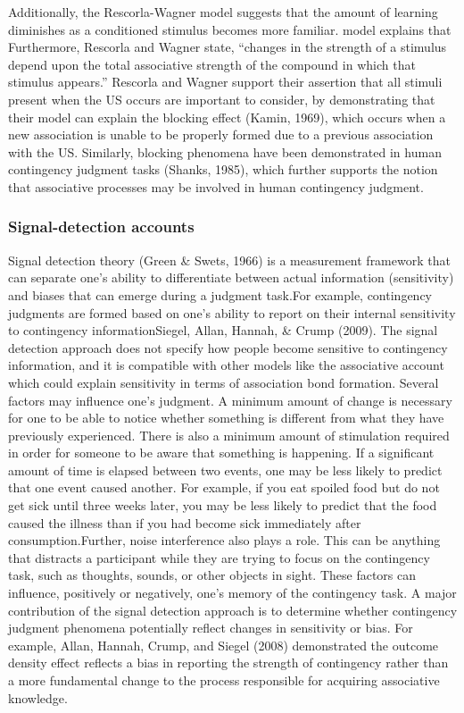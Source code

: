 \documentclass[
  english,
  man,floatsintext]{apa6}
\begin{document}
Additionally, the Rescorla-Wagner model suggests that the amount of learning diminishes as a conditioned stimulus becomes more familiar. model explains that Furthermore, Rescorla and Wagner state, ``changes in the strength of a stimulus depend upon the total associative strength of the compound in which that stimulus appears.'' Rescorla and Wagner support their assertion that all stimuli present when the US occurs are important to consider, by demonstrating that their model can explain the blocking effect (Kamin, 1969), which occurs when a new association is unable to be properly formed due to a previous association with the US. Similarly, blocking phenomena have been demonstrated in human contingency judgment tasks (Shanks, 1985), which further supports the notion that associative processes may be involved in human contingency judgment.

\hypertarget{signal-detection-accounts}{%
\subsubsection{Signal-detection accounts}\label{signal-detection-accounts}}

Signal detection theory (Green \& Swets, 1966) is a measurement framework that can separate one's ability to differentiate between actual information (sensitivity) and biases that can emerge during a judgment task.For example, contingency judgments are formed based on one's ability to report on their internal sensitivity to contingency informationSiegel, Allan, Hannah, \& Crump (2009). The signal detection approach does not specify how people become sensitive to contingency information, and it is compatible with other models like the associative account which could explain sensitivity in terms of association bond formation. Several factors may influence one's judgment. A minimum amount of change is necessary for one to be able to notice whether something is different from what they have previously experienced. There is also a minimum amount of stimulation required in order for someone to be aware that something is happening. If a significant amount of time is elapsed between two events, one may be less likely to predict that one event caused another. For example, if you eat spoiled food but do not get sick until three weeks later, you may be less likely to predict that the food caused the illness than if you had become sick immediately after consumption.Further, noise interference also plays a role. This can be anything that distracts a participant while they are trying to focus on the contingency task, such as thoughts, sounds, or other objects in sight. These factors can influence, positively or negatively, one's memory of the contingency task. A major contribution of the signal detection approach is to determine whether contingency judgment phenomena potentially reflect changes in sensitivity or bias. For example, Allan, Hannah, Crump, and Siegel (2008) demonstrated the outcome density effect reflects a bias in reporting the strength of contingency rather than a more fundamental change to the process responsible for acquiring associative knowledge.
\end{document}
